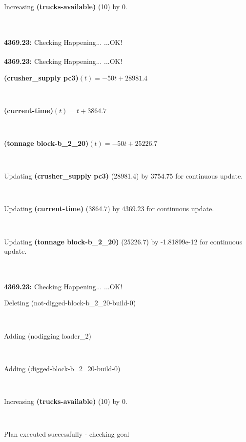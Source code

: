 \documentclass[a4paper,12pt]{article}
\newcommand{\atime}[1]{{\bf #1:}}
\newcommand{\exprn}[1]{{\sf #1}}
\newcommand{\fexprn}[1]{{\small {\bf #1}}}
\newcommand{\checkhappening}{Checking Happening... }
\newcommand{\listrow}[1]{\begin{minipage}[t]{11.5cm} #1 \end{minipage}}
\newcommand{\happeningOK}{...OK!}
\newcommand{\assignmentcts}[3]{\listrow{Updating \fexprn{#1} (#2) by #3 for continuous update.}}
\newcommand{\increase}[3]{\listrow{Increasing \fexprn{#1} (#2) by #3.}}
\newcommand{\function}[2]{\listrow{\fexprn{#1}$(t) = #2$}}
\newcommand{\adding}[1]{\listrow{Adding \exprn{#1} }}
\newcommand{\deleting}[1]{\listrow{Deleting \exprn{#1} }}
\begin{document}
\begin{tabbing}
 \> \increase{(trucks-available)}{10}{0}\\
\\
\atime{4369.23} \> \checkhappening\happeningOK\\
\\
\atime{4369.23} \> \checkhappening\happeningOK\\
 \> \function{(crusher\_supply pc3)}{ - 50t + 28981.4}\\
 \> \function{(current-time)}{t + 3864.7}\\
 \> \function{(tonnage block-b\_2\_20)}{ - 50t + 25226.7}\\
 \> \assignmentcts{(crusher\_supply pc3)}{28981.4}{3754.75}\\
 \> \assignmentcts{(current-time)}{3864.7}{4369.23}\\
 \> \assignmentcts{(tonnage block-b\_2\_20)}{25226.7}{-1.81899e-12}\\
\\
\atime{4369.23} \> \checkhappening\happeningOK\\
 \> \deleting{(not-digged-block-b\_2\_20-build-0)}\\
 \> \adding{(nodigging loader\_2)}\\
 \> \adding{(digged-block-b\_2\_20-build-0)}\\
 \> \increase{(trucks-available)}{10}{0}\\
\end{tabbing}
Plan executed successfully - checking goal\\
\\
\end{document}
